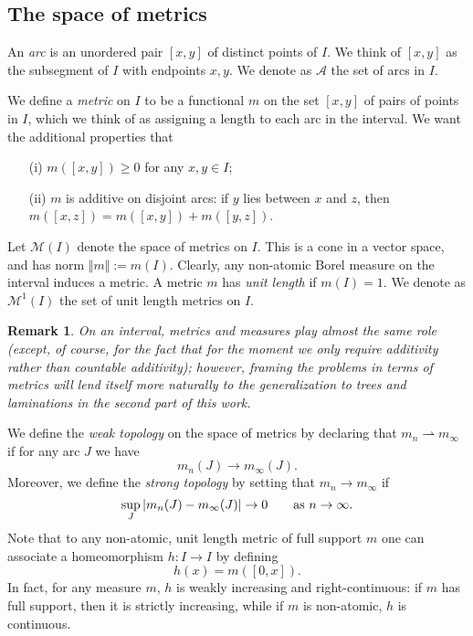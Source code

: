 \documentclass[11pt]{amsart}
\newtheorem{remark}[theorem]{Remark}
\begin{document}
\subsection{The space of metrics}

An \emph{arc} is an unordered pair $[x, y]$ of distinct points of $I$. We think of $[x, y]$ as the 
subsegment of $I$ with endpoints $x, y$. We denote as $\mathcal{A}$ the set of arcs in $I$. 

We define  a \emph{metric} on $I$ to be a functional $m$ on the set $[x,y]$ of pairs of points in $I$, 
which we think of as assigning a length to each arc in the interval. 
We want the additional  properties that 
\begin{itemize}
\item[(i)] 
$m([x,y]) \geq 0$ for any $x,y \in I$;
\item[(ii)]
$m$ is additive on disjoint arcs: if $y$ lies between $x$ and $z$, then $m([x,z]) = m([x,y]) + m([y, z])$.
\end{itemize}

Let $\mathcal{M}(I)$ denote the space of metrics on $I$. This is a cone in a vector space, and has norm $\Vert m \Vert := m(I)$.
Clearly, any non-atomic Borel measure on the interval induces a metric. 
A metric $m$ has \emph{unit length} if $m(I) = 1$. We denote as $\mathcal{M}^1(I)$ the set of unit length metrics on $I$. 

\begin{remark}
On an interval, metrics and measures play almost the same role (except, of course, for the fact that for the moment we only require additivity 
rather than countable additivity); however, framing the problems in terms of metrics will lend itself more naturally to the generalization to trees and laminations
in the second part of this work. 
\end{remark}

\medskip
We define the \emph{weak topology} on the space of metrics by declaring that 
$m_n \rightharpoonup m_\infty$ if 
for any arc $J$ we have 
$$m_n(J) \to m_\infty(J).$$
Moreover, we define the \emph{strong topology} by setting that 
$m_n \to m_\infty$ if 
$$\sup_{J} |m_n(J) - m_\infty(J)| \to 0 \qquad \textup{as }n \to \infty.$$
Note that to any non-atomic, unit length metric of full support $m$ one can 
associate a homeomorphism $h : I \to I$ by defining 
$$h(x) = m([0,x]).$$
In fact, for any measure $m$, $h$ is weakly increasing and right-continuous: if $m$ has full support, 
then it is strictly increasing, while if $m$ is non-atomic, $h$ is continuous.
\end{document}
